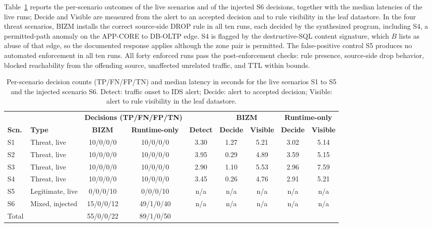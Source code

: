 \documentclass[final,5p]{elsarticle}
\begin{document}
Table~\ref{tab:live} reports the per-scenario outcomes of the live scenarios and of the injected S6 decisions, together with the median latencies of the live runs; Decide and Visible are measured from the alert to an accepted decision and to rule visibility in the leaf datastore. In the four threat scenarios, BIZM installs the correct source-side DROP rule in all ten runs, each decided by the synthesized program, including S4, a permitted-path anomaly on the APP-CORE to DB-OLTP edge. S4 is flagged by the destructive-SQL content signature, which $B$ lists as abuse of that edge, so the documented response applies although the zone pair is permitted. The false-positive control S5 produces no automated enforcement in all ten runs. All forty enforced runs pass the post-enforcement checks: rule presence, source-side drop behavior, blocked reachability from the offending source, unaffected unrelated traffic, and TTL within bounds.

\begin{table}[t]
    \centering
    \caption{Per-scenario decision counts (TP/FN/FP/TN) and median latency in seconds for the live scenarios S1 to S5 and the injected scenario S6. Detect: traffic onset to IDS alert; Decide: alert to accepted decision; Visible: alert to rule visibility in the leaf datastore.}
    \label{tab:live}
    \small
    \setlength{\tabcolsep}{5pt}
    \begin{tabular}{@{}llcc c cc cc@{}}
        \toprule
        & & \multicolumn{2}{c}{\textbf{Decisions (TP/FN/FP/TN)}} & & \multicolumn{2}{c}{\textbf{BIZM}} & \multicolumn{2}{c}{\textbf{Runtime-only}} \\
        \cmidrule(lr){3-4}\cmidrule(lr){6-7}\cmidrule(l){8-9}
        \textbf{Scn.} & \textbf{Type} & \textbf{BIZM} & \textbf{Runtime-only} & \textbf{Detect} & \textbf{Decide} & \textbf{Visible} & \textbf{Decide} & \textbf{Visible} \\
        \midrule
        S1 & Threat, live        & 10/0/0/0  & 10/0/0/0  & 3.30 & 1.27 & 5.21 & 3.02 & 5.14 \\
        S2 & Threat, live        & 10/0/0/0  & 10/0/0/0  & 3.95 & 0.29 & 4.89 & 3.59 & 5.15 \\
        S3 & Threat, live        & 10/0/0/0  & 10/0/0/0  & 2.90 & 1.10 & 5.53 & 2.96 & 7.59 \\
        S4 & Threat, live        & 10/0/0/0  & 10/0/0/0  & 3.45 & 0.26 & 4.76 & 2.91 & 5.21 \\
        S5 & Legitimate, live    & 0/0/0/10  & 0/0/0/10  & n/a  & n/a  & n/a  & n/a  & n/a  \\
        S6 & Mixed, injected     & 15/0/0/12 & 49/1/0/40 & n/a   & n/a   & n/a   & n/a   & n/a   \\
        \midrule
        Total & & 55/0/0/22 & 89/1/0/50 & & & & & \\
        \bottomrule
    \end{tabular}
\end{table}
\end{document}

